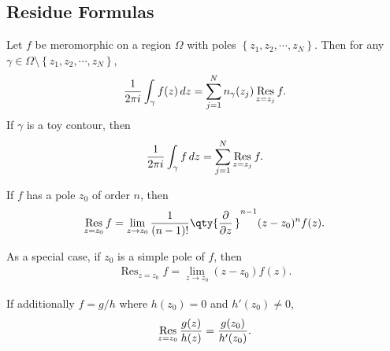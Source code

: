 \hypertarget{residue-formulas}{%
\subsection{Residue Formulas}\label{residue-formulas}}

\begin{theorem}

Let \(f\) be meromorphic on a region \(\Omega\) with poles
\(\left\{{ { {z}_1, {z}_2, \cdots, {z}_{N}} }\right\}\). Then for any
\(\gamma \in \Omega\setminus\left\{{ { {z}_1, {z}_2, \cdots, {z}_{N}} }\right\}\),
\begin{align*}
{1 \over 2\pi i } \int_\gamma f(z) \,dz= \sum_{j=1}^N n_\gamma(z_j) \mathop{\mathrm{Res}}_{z=z_j} f
.\end{align*}
If \(\gamma\) is a toy contour, then\\
\begin{align*}
{1\over 2\pi i}\int_\gamma f\,dz= \sum_{j=1}^N \mathop{\mathrm{Res}}_{z=z_j}f
.\end{align*}

\end{theorem}

\begin{proposition}

If \(f\) has a pole \(z_0\) of order \(n\), then
\begin{align*}  
\mathop{\mathrm{Res}}_{z=z_0} f = \lim_{z\to z_0} {1 \over (n-1)!} \qty{{\frac{\partial }{\partial z}\,}}^{n-1} (z-z_0)^n f(z)
.\end{align*}

\end{proposition}

\begin{proposition}

As a special case, if \(z_0\) is a simple pole of \(f\), then
\begin{align*}  
\mathop{\mathrm{Res}}_{z=z_0}f = \lim_{z\to z_0} (z-z_0) f(z)
.\end{align*}

\end{proposition}

\begin{corollary}

If additionally \(f=g/h\) where \(h(z_0) = 0\) and \(h'(z_0)\neq 0\),
\begin{align*}
\mathop{\mathrm{Res}}_{z=z_0} {g(z) \over h(z)} = {g(z_0) \over h'(z_0)}
.\end{align*}

\end{corollary}


